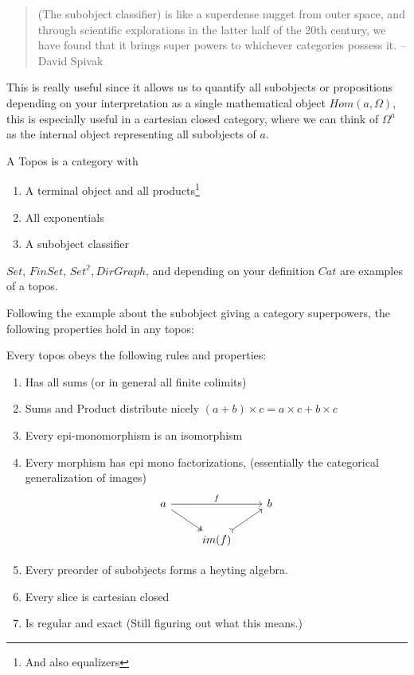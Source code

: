 \begin{quote}
    (The subobject classifier) is like a superdense nugget from outer space, and through scientific explorations in the latter half of the 20th century, we have found that it brings super powers to whichever categories possess it.
    -- David Spivak
\end{quote}
This is really useful since it allows us to quantify all subobjects or propositions depending on your interpretation as a single mathematical object $Hom(a, \Omega)$, this is especially useful in a cartesian closed category, where we can think of $\Omega^a$ as the internal object representing all subobjects of $a$.
\begin{definition}[Topos]
    A Topos is a category with
    \begin{enumerate}
        \item A terminal object and all products\footnote{And also equalizers}
        \item All exponentials
        \item A subobject classifier
    \end{enumerate}
\end{definition}
\begin{example}
    $Set$, $FinSet$, $Set^\mathbb{2}, DirGraph$, and depending on your definition $Cat$ are examples of a topos.
\end{example}
Following the example about the subobject giving a category superpowers, the following properties hold in any topos:
\begin{theorem}
    Every topos obeys the following rules and properties:
    \begin{enumerate}
        \item Has all sums (or in general all finite colimits)
        \item Sums and Product distribute nicely $(a + b) \times c = a \times c + b \times c$
        \item Every epi-monomorphism is an isomorphism
        \item Every morphism has epi mono factorizations, (essentially the categorical generalization of images)
        \[\begin{tikzcd}
        	a && b \\
        	& {im(f)}
        	\arrow["f", from=1-1, to=1-3]
        	\arrow[two heads, from=1-1, to=2-2]
        	\arrow[tail, from=2-2, to=1-3]
        \end{tikzcd}\]
        \item Every preorder of subobjects forms a heyting algebra.
        \item Every slice is cartesian closed
        \item Is regular and exact (Still figuring out what this means.)
    \end{enumerate}
\end{theorem}




